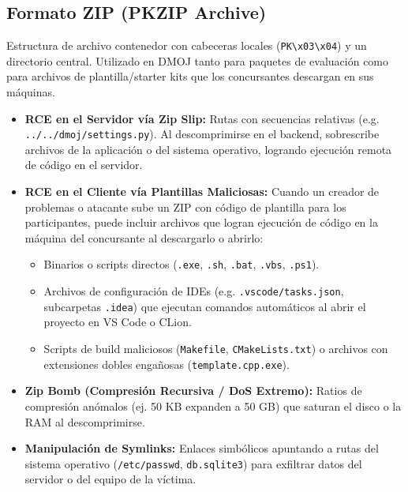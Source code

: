 \documentclass[11pt,a4paper]{article}
\begin{document}
\subsection{Formato ZIP (PKZIP Archive)}
Estructura de archivo contenedor con cabeceras locales (\texttt{PK\textbackslash x03\textbackslash x04}) y un directorio central. Utilizado en DMOJ tanto para paquetes de evaluación como para archivos de plantilla/starter kits que los concursantes descargan en sus máquinas.
\begin{itemize}
    \item \textbf{RCE en el Servidor vía Zip Slip:} Rutas con secuencias relativas (e.g. \texttt{../../dmoj/settings.py}). Al descomprimirse en el backend, sobrescribe archivos de la aplicación o del sistema operativo, logrando ejecución remota de código en el servidor.
    \item \textbf{RCE en el Cliente vía Plantillas Maliciosas:} Cuando un creador de problemas o atacante sube un ZIP con código de plantilla para los participantes, puede incluir archivos que logran ejecución de código en la máquina del concursante al descargarlo o abrirlo:
    \begin{itemize}
        \item Binarios o scripts directos (\texttt{.exe}, \texttt{.sh}, \texttt{.bat}, \texttt{.vbs}, \texttt{.ps1}).
        \item Archivos de configuración de IDEs (e.g. \texttt{.vscode/tasks.json}, subcarpetas \texttt{.idea}) que ejecutan comandos automáticos al abrir el proyecto en VS Code o CLion.
        \item Scripts de build maliciosos (\texttt{Makefile}, \texttt{CMakeLists.txt}) o archivos con extensiones dobles engañosas (\texttt{template.cpp.exe}).
    \end{itemize}
    \item \textbf{Zip Bomb (Compresión Recursiva / DoS Extremo):} Ratios de compresión anómalos (ej. 50 KB expanden a 50 GB) que saturan el disco o la RAM al descomprimirse.
    \item \textbf{Manipulación de Symlinks:} Enlaces simbólicos apuntando a rutas del sistema operativo (\texttt{/etc/passwd}, \texttt{db.sqlite3}) para exfiltrar datos del servidor o del equipo de la víctima.
\end{itemize}
\end{document}
